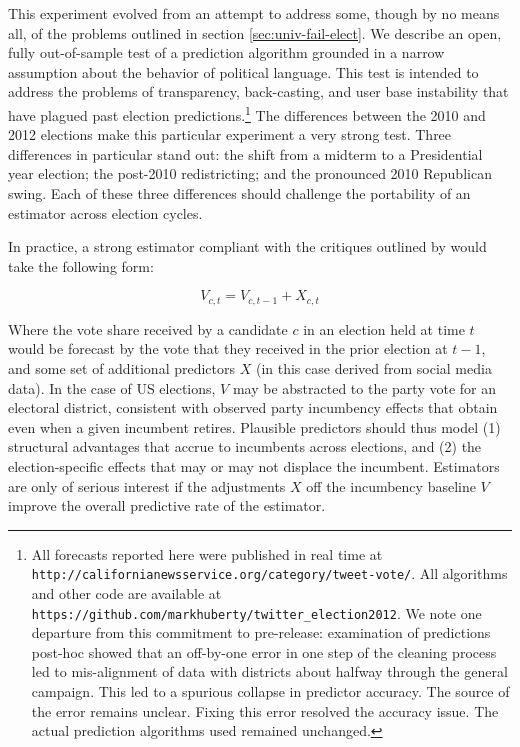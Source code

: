 \documentclass{article}
\begin{document}
This experiment evolved from an attempt to address some, though by no means
all, of the problems outlined in section \ref{sec:univ-fail-elect}. We describe an open, fully out-of-sample test
of a prediction algorithm grounded in a narrow assumption about the
behavior of political language. This test is intended to address the
problems of transparency, back-casting, and user base instability that
have plagued past election predictions.\footnote{All forecasts reported here were published in
real time at \texttt{http://californianewsservice.org/category/tweet-vote/}.  All
algorithms and other code are available at
\texttt{https://github.com/markhuberty/twitter\_election2012}. We note one departure from this commitment to
  pre-release: examination of predictions post-hoc showed that an
  off-by-one error in one step of the cleaning process led to
  mis-alignment of data with districts about halfway through the general
  campaign. This led to a spurious collapse in predictor accuracy. The
  source of the error remains unclear. Fixing this error resolved the
  accuracy issue. The actual prediction algorithms used remained
  unchanged.} 
The differences between the 2010 and 2012 elections make this
particular experiment a very strong test. Three differences in
particular stand out: the shift from a midterm to a Presidential year
election; the post-2010 redistricting; and the pronounced 2010
Republican swing. Each of these three differences should challenge the
portability of an estimator across election cycles.

In practice, a strong estimator compliant with the critiques outlined
by \cite{metaxas2011not} would take the following form:

\begin{equation}
  \label{eq:1}
  V_{c,t} = V_{c,t - 1} + X_{c,t}
\end{equation}

Where the vote share received by a candidate $c$ in an election held
at time $t$ would be forecast by the vote that they received in the
prior election at $t-1$, and some set of additional predictors $X$ (in
this case derived from social media data). In the case of US
elections, $V$ may be abstracted to the party vote for an electoral
district, consistent with observed party incumbency effects that
obtain even when a given incumbent retires. Plausible predictors
should thus model (1) structural advantages that accrue to incumbents
across elections, and (2) the election-specific effects that may or
may not displace the incumbent. Estimators are only of serious
interest if the adjustments $X$ off the incumbency baseline $V$
improve the overall predictive rate of the estimator.
\end{document}
